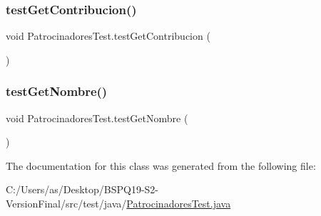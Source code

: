 \mbox{\label{class_patrocinadores_test_a740bbee7fb1c4d7cd0df399e26a3707b}} 
\subsubsection{\texorpdfstring{testGetContribucion()}{testGetContribucion()}}
{\footnotesize\ttfamily void Patrocinadores\+Test.\+test\+Get\+Contribucion (\begin{DoxyParamCaption}{ }\end{DoxyParamCaption})}

\mbox{\label{class_patrocinadores_test_a5a9f3783461fac8e1706b9dbd7896919}} 
\subsubsection{\texorpdfstring{testGetNombre()}{testGetNombre()}}
{\footnotesize\ttfamily void Patrocinadores\+Test.\+test\+Get\+Nombre (\begin{DoxyParamCaption}{ }\end{DoxyParamCaption})}



The documentation for this class was generated from the following file\+:\begin{DoxyCompactItemize}
\item 
C\+:/\+Users/as/\+Desktop/\+B\+S\+P\+Q19-\/\+S2-\/\+Version\+Final/src/test/java/\mbox{\hyperlink{_patrocinadores_test_8java}{Patrocinadores\+Test.\+java}}\end{DoxyCompactItemize}
